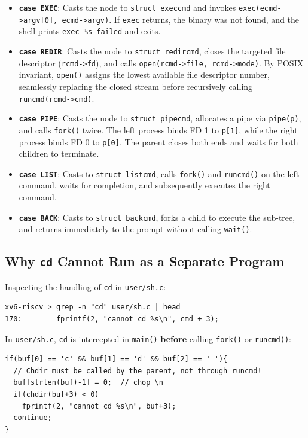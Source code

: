 \documentclass[12pt,a4paper]{article}
\begin{document}
\begin{itemize}
    \item \textbf{\texttt{case EXEC}}: Casts the node to \texttt{struct execcmd} and invokes \texttt{exec(ecmd->argv[0], ecmd->argv)}. If \texttt{exec} returns, the binary was not found, and the shell prints \texttt{exec \%s failed} and exits.
    \item \textbf{\texttt{case REDIR}}: Casts the node to \texttt{struct redircmd}, closes the targeted file descriptor (\texttt{rcmd->fd}), and calls \texttt{open(rcmd->file, rcmd->mode)}. By POSIX invariant, \texttt{open()} assigns the lowest available file descriptor number, seamlessly replacing the closed stream before recursively calling \texttt{runcmd(rcmd->cmd)}.
    \item \textbf{\texttt{case PIPE}}: Casts the node to \texttt{struct pipecmd}, allocates a pipe via \texttt{pipe(p)}, and calls \texttt{fork()} twice. The left process binds FD 1 to \texttt{p[1]}, while the right process binds FD 0 to \texttt{p[0]}. The parent closes both ends and waits for both children to terminate.
    \item \textbf{\texttt{case LIST}}: Casts to \texttt{struct listcmd}, calls \texttt{fork()} and \texttt{runcmd()} on the left command, waits for completion, and subsequently executes the right command.
    \item \textbf{\texttt{case BACK}}: Casts to \texttt{struct backcmd}, forks a child to execute the sub-tree, and returns immediately to the prompt without calling \texttt{wait()}.
\end{itemize}

\subsection{Why \texttt{cd} Cannot Run as a Separate Program}
Inspecting the handling of \texttt{cd} in \texttt{user/sh.c}:
\begin{lstlisting}[style=consolestyle, caption={Internal handling of cd in user/sh.c}]
xv6-riscv > grep -n "cd" user/sh.c | head
170:        fprintf(2, "cannot cd %s\n", cmd + 3);
\end{lstlisting}

In \texttt{user/sh.c}, \texttt{cd} is intercepted in \texttt{main()} \textbf{before} calling \texttt{fork()} or \texttt{runcmd()}:
\begin{lstlisting}[style=cstyle]
if(buf[0] == 'c' && buf[1] == 'd' && buf[2] == ' '){
  // Chdir must be called by the parent, not through runcmd!
  buf[strlen(buf)-1] = 0;  // chop \n
  if(chdir(buf+3) < 0)
    fprintf(2, "cannot cd %s\n", buf+3);
  continue;
}
\end{lstlisting}
\end{document}
